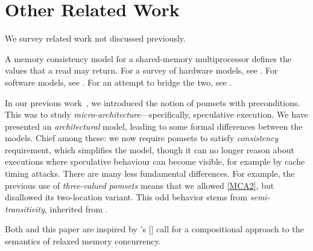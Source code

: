\section{Other Related Work}\label{sec:related}
We survey related work not discussed previously.

A memory consistency model for a shared-memory multiprocessor defines the
values that a read may return.  For a survey of hardware models, see
\citep{AlglaveThesis}. For software models, see
\citep{DBLP:journals/toplas/Lochbihler13,DBLP:phd/ethos/Batty15}.  For an
attempt to bridge the two, see \citep{DBLP:journals/pacmpl/PodkopaevLV19}.

In our previous work~\cite{2019-sp}, we introduced the notion of pomsets with preconditions.
This was to study \emph{micro\hyp{}architecture}---specifically, speculative execution.
We have presented an \emph{architectural} model, leading to some formal
differences between the models.  Chief among these: we now require pomsets
to satisfy \emph{consistency} requirement, which simplifies the model,
though it can no longer reason about executions where speculative
behaviour can become visible, for example by cache timing attacks.
There are many less fundamental differences.  For example,
the previous use of \emph{three-valued pomsets} means that we allowed \ref{MCA2},
but disallowed its two-location variant.  This odd behavior stems from
\emph{semi\hyp{}transitivity}, inherited from
\cite{DBLP:journals/dc/Lamport86}.

Both \cite{2019-sp} and this paper are inspired by \citeauthor{Batty17}'s
[\citeyear{Batty17}] call for a compositional approach to the semantics of
relaxed memory concurrency.  

